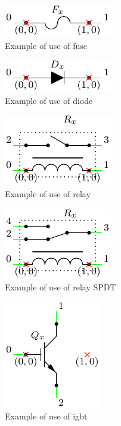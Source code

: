 \documentclass[a4paper,12pt]{report}
\begin{document}
\begin{figure}[h]
\centering
\includegraphics{fuseInfo}
\caption{Example of use of fuse}
\label{fuseInfo} %
\end{figure}

\begin{figure}[h]
\centering
\includegraphics{diodeInfo}
\caption{Example of use of diode}
\label{diodeInfo} %
\end{figure}

\begin{figure}[h]
\centering
\includegraphics{relayInfo}
\caption{Example of use of relay}
\label{relayInfo} %
\end{figure}

\begin{figure}[h]
\centering
\includegraphics{relaySPDTInfo}
\caption{Example of use of relay SPDT}
\label{relaySPDTInfo} %
\end{figure}

\begin{figure}[h]
\centering
\includegraphics{igbtInfo}
\caption{Example of use of igbt}
\label{igbtrInfo} %
\end{figure}
\end{document}

